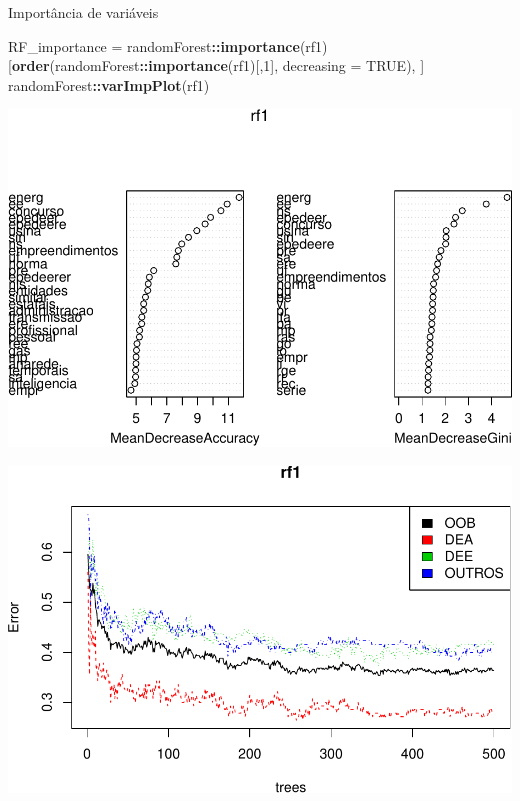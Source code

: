 \documentclass[]{article}
\newenvironment{Shaded}{\begin{snugshade}}{\end{snugshade}}
\newcommand{\KeywordTok}[1]{\textcolor[rgb]{0.13,0.29,0.53}{\textbf{#1}}}
\newcommand{\DataTypeTok}[1]{\textcolor[rgb]{0.13,0.29,0.53}{#1}}
\newcommand{\DecValTok}[1]{\textcolor[rgb]{0.00,0.00,0.81}{#1}}
\newcommand{\StringTok}[1]{\textcolor[rgb]{0.31,0.60,0.02}{#1}}
\newcommand{\OtherTok}[1]{\textcolor[rgb]{0.56,0.35,0.01}{#1}}
\newcommand{\OperatorTok}[1]{\textcolor[rgb]{0.81,0.36,0.00}{\textbf{#1}}}
\newcommand{\NormalTok}[1]{#1}
\begin{document}
Importância de variáveis

\begin{Shaded}
\begin{Highlighting}[]
\NormalTok{RF_importance =}\StringTok{ }\NormalTok{randomForest}\OperatorTok{::}\KeywordTok{importance}\NormalTok{(rf1)[}\KeywordTok{order}\NormalTok{(randomForest}\OperatorTok{::}\KeywordTok{importance}\NormalTok{(rf1)[,}\DecValTok{1}\NormalTok{], }\DataTypeTok{decreasing =} \OtherTok{TRUE}\NormalTok{), ]}
\NormalTok{randomForest}\OperatorTok{::}\KeywordTok{varImpPlot}\NormalTok{(rf1)}
\end{Highlighting}
\end{Shaded}

\includegraphics{markdown_v41_test_files/figure-latex/unnamed-chunk-84-1.pdf}

\begin{Shaded}
\end{Shaded}

\includegraphics{markdown_v41_test_files/figure-latex/unnamed-chunk-85-1.pdf}
\end{document}
